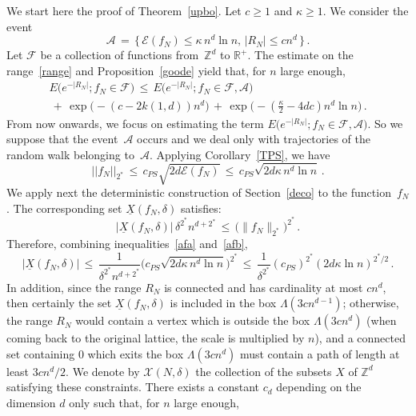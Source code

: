 \documentclass[AHL, Unicode, longabstracts, published]{cedram}
\newcommand{\XX}{{\underline{X}}}
\newcommand*\Zd {{\mathbb Z^d}}
\newcommand*\R{\mathbb{R}}
\newcommand*\La {{\Lambda}}
\newcommand{\cA}{\mathcal{A}}
\newcommand{\cE}{\mathcal{E}}
\newcommand{\cF}{\mathcal{F}}
\newcommand{\cX}{\mathcal{X}}
\begin{document}
We start here the proof of Theorem~\ref{upbo}. Let $c\geq 1$ and $\kappa\geq 1$. We consider the event
\begin{equation*}\label{defa}
\cA\,=\,\big\{\,
\cE(f_N)\leq\kappa \,n^d\ln n,\, |R_N|\leq cn^d\,\big\}\,.
\end{equation*}
Let $\cF$ be a collection of functions from~$\Zd$ to $\R^+$. The estimate on the range~\eqref{range} and Proposition~\ref{goode} yield that, for $n$ large enough,
\begin{multline}
E\big(e^{-|R_N|}; f_N\in\cF)\,\leq\, E\big(e^{-|R_N|}; f_N\in\cF,\cA)
\\
\,+\,
\exp\big(-(c-2k(1,d))n^d\big)\,+\,
\exp\Big(-\left(\frac{\kappa}{2}-4dc\right)n^d\ln n\Big)\,.\label{inisum}
\end{multline}
From now onwards, we focus on estimating the term $E\big(e^{-|R_N|}; f_N\in\cF,\cA)$. So we suppose that the event~$\cA$ occurs and we deal only with trajectories of the random walk belonging to~$\cA$. Applying Corollary~\ref{TPS}, we have
\begin{equation}\label{afa}
||f_N||_{2^*}
\,\leq\, c_{PS}
\sqrt{2d\cE(f_N)}\,\leq\, c_{PS}
\sqrt{2d\kappa \,n^d\ln n}
\,.
\end{equation}
We apply next the deterministic construction of Section~\ref{deco} to the function~$f_N$. The corresponding set $\XX(f_N,\delta)$ satisfies:
\begin{equation}\label{afb}
\big|\XX(f_N,\delta)\big|\,
\delta^{2^*} n^{d+2^*}
\,\leq\,
\big(\|f_N\|_{2^*}\big)^{2^*}\,.
\end{equation}
Therefore, combining inequalities~\eqref{afa} and~\eqref{afb},
\begin{equation}\label{cardx}
\big|\XX(f_N,\delta)\big|\,\leq\,
\frac{1}{ \delta^{2^*} n^{d+2^*} }
\Big(c_{PS}
\sqrt{2d\kappa \,n^d\ln n}\Big)^{2^*}\,\leq\,
\frac{1} { \delta^{2^*}} (c_{PS})^{2^*} (2d\kappa\ln n)^{2^*/2}
\,.
\end{equation}
In addition, since the range $R_N$ is connected and has cardinality at most $cn^d$, then certainly the set $\XX(f_N,\delta)$ is included in the box $\La(3cn^{d-1})$; otherwise, the range $R_N$ would contain a vertex which is outside the box $\La(3cn^d)$ (when coming back to the original lattice, the scale is multiplied by $n$), and a connected set containing $0$ which exits the box $\La(3cn^{d})$ must contain a path of length at least $3cn^{d}/2$. We denote by $\cX(N,\delta)$ the collection of the subsets $X$ of $\Zd$ satisfying these constraints. There exists a constant $c_d$ depending on the dimension $d$ only such that, for $n$ large enough,
\end{document}
